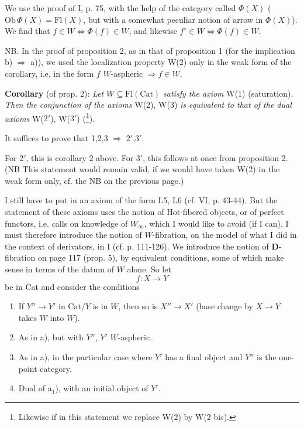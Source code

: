 We use the proof of I, p. 75, with the help of the category called $\Phi(X)$ ($\mathrm{Ob}\,\Phi(X) = \mathrm{Fl}(X)$, but with a somewhat peculiar notion of arrow in $\Phi(X)$). We find that $f \in W \iff \Phi(f) \in W$, and likewise $f^\circ \in W \iff \Phi(f) \in W$.

NB. In the proof of proposition 2, as in that of proposition 1 (for the implication b) $\Longrightarrow$ a)), we used the localization property W(2) only in the weak form of the corollary, i.e. in the form $f$ $W$-aspheric $\Longrightarrow f \in W$.

\textbf{Corollary} (of prop. 2): \textit{Let $W \subseteq \mathrm{Fl}(\mathrm{Cat})$ satisfy the axiom} W(1) (saturation). \textit{Then the conjunction of the axioms} W(2), W(3) \textit{is equivalent to that of the dual axioms} W($2'$), W($3'$) (\footnote[5]{Likewise if in this statement we replace W(2) by W(2 bis).}).

It suffices to prove that 1,2,3 $\Longrightarrow$ $2'$,$3'$.


For $2'$, this is corollary 2 above. For $3'$, this follows at once from proposition 2. (NB This statement would remain valid, if we would have taken W(2) in the weak form only, cf. the NB on the previous page.)

I still have to put in an axiom of the form L5, L6 (cf. VI, p. 43-44). But the statement of these axioms uses the notion of Hot-fibered objects, or of perfect functors, i.e. calls on knowledge of $W_\infty$, which I would like to avoid (if I can). I must therefore introduce the notion of $W$-fibration, on the model of what I did in the context of derivators, in I (cf. p. 111-126). We introduce the notion of \textbf{D}-fibration on page 117 (prop. 5), by equivalent conditions, some of which make sense in terms of the datum of $W$ alone. So let
\[ f : X \longrightarrow Y \]
be in Cat and consider the conditions

\begin{enumerate}
\item[a)] If $Y'' \longrightarrow Y'$ in $\mathrm{Cat}/Y$ is in $W$, then so is $X'' \longrightarrow X'$ (base change by $X \longrightarrow Y$ takes $W$ into $W$).
\item[a$'$)] As in a), but with $Y''$, $Y'$ $W$-aspheric.
\item[a$_1$)] As in a), in the particular case where $Y'$ has a final object and $Y''$ is the one-point category.
\item[a$_2$)] Dual of a$_1$), with an initial object of $Y'$.
\end{enumerate}

